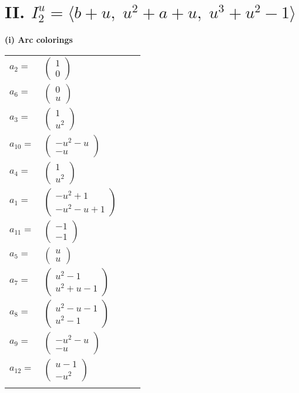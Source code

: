 \documentclass[1p]{elsarticle_modified}
\theoremstyle{definition}
\begin{document}
\centering \section*{II. $I^u_{2}= \langle b+u,\;u^2+a+u,\;u^3+u^2-1 \rangle$}
\flushleft \textbf{(i) Arc colorings}\\
\begin{tabular}{m{7pt} m{180pt} m{7pt} m{180pt} }
\flushright $a_{2}=$&$\begin{pmatrix}1\\0\end{pmatrix}$ \\
\flushright $a_{6}=$&$\begin{pmatrix}0\\u\end{pmatrix}$ \\
\flushright $a_{3}=$&$\begin{pmatrix}1\\u^2\end{pmatrix}$ \\
\flushright $a_{10}=$&$\begin{pmatrix}- u^2- u\\- u\end{pmatrix}$ \\
\flushright $a_{4}=$&$\begin{pmatrix}1\\u^2\end{pmatrix}$ \\
\flushright $a_{1}=$&$\begin{pmatrix}- u^2+1\\- u^2- u+1\end{pmatrix}$ \\
\flushright $a_{11}=$&$\begin{pmatrix}-1\\-1\end{pmatrix}$ \\
\flushright $a_{5}=$&$\begin{pmatrix}u\\u\end{pmatrix}$ \\
\flushright $a_{7}=$&$\begin{pmatrix}u^2-1\\u^2+u-1\end{pmatrix}$ \\
\flushright $a_{8}=$&$\begin{pmatrix}u^2- u-1\\u^2-1\end{pmatrix}$ \\
\flushright $a_{9}=$&$\begin{pmatrix}- u^2- u\\- u\end{pmatrix}$ \\
\flushright $a_{12}=$&$\begin{pmatrix}u-1\\- u^2\end{pmatrix}$\\&\end{tabular}
\end{document}
